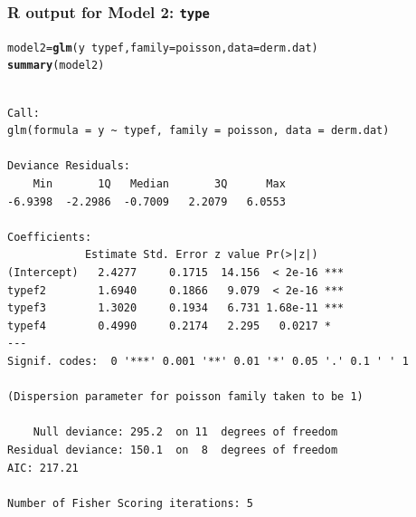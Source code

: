 \documentclass[oneside]{book}\usepackage[]{graphicx}\usepackage[svgnames]{xcolor}
\makeatletter
\newcommand{\hlopt}[1]{\textcolor[rgb]{0,0,0}{#1}}%
\newcommand{\hlstd}[1]{\textcolor[rgb]{0.345,0.345,0.345}{#1}}%
\newcommand{\hlkwb}[1]{\textcolor[rgb]{0.69,0.353,0.396}{#1}}%
\newcommand{\hlkwc}[1]{\textcolor[rgb]{0.333,0.667,0.333}{#1}}%
\newcommand{\hlkwd}[1]{\textcolor[rgb]{0.737,0.353,0.396}{\textbf{#1}}}%
\newenvironment{kframe}{%
 \def\at@end@of@kframe{}%
 \ifinner\ifhmode%
  \def\at@end@of@kframe{\end{minipage}}%
  \begin{minipage}{\columnwidth}%
 \fi\fi%
 \def\FrameCommand##1{\hskip\@totalleftmargin \hskip-\fboxsep
 \colorbox{shadecolor}{##1}\hskip-\fboxsep
     \hskip-\linewidth \hskip-\@totalleftmargin \hskip\columnwidth}%
 \MakeFramed {\advance\hsize-\width
   \@totalleftmargin\z@ \linewidth\hsize
   \@setminipage}}%
 {\par\unskip\endMakeFramed%
 \at@end@of@kframe}
\newenvironment{knitrout}{}{} %
\makeatother
\begin{document}
\subsubsection*{R output for Model 2: \texttt{type}}
\begin{knitrout}
\color{fgcolor}\begin{kframe}
\begin{alltt}
\hlstd{model2} \hlkwb{=} \hlkwd{glm}\hlstd{(y} \hlopt{~} \hlstd{typef,} \hlkwc{family} \hlstd{= poisson,} \hlkwc{data} \hlstd{= derm.dat)}
\hlkwd{summary}\hlstd{(model2)}
\end{alltt}
\begin{verbatim}

Call:
glm(formula = y ~ typef, family = poisson, data = derm.dat)

Deviance Residuals: 
    Min       1Q   Median       3Q      Max  
-6.9398  -2.2986  -0.7009   2.2079   6.0553  

Coefficients:
            Estimate Std. Error z value Pr(>|z|)    
(Intercept)   2.4277     0.1715  14.156  < 2e-16 ***
typef2        1.6940     0.1866   9.079  < 2e-16 ***
typef3        1.3020     0.1934   6.731 1.68e-11 ***
typef4        0.4990     0.2174   2.295   0.0217 *  
---
Signif. codes:  0 '***' 0.001 '**' 0.01 '*' 0.05 '.' 0.1 ' ' 1

(Dispersion parameter for poisson family taken to be 1)

    Null deviance: 295.2  on 11  degrees of freedom
Residual deviance: 150.1  on  8  degrees of freedom
AIC: 217.21

Number of Fisher Scoring iterations: 5
\end{verbatim}
\end{kframe}
\end{knitrout}
\end{document}
